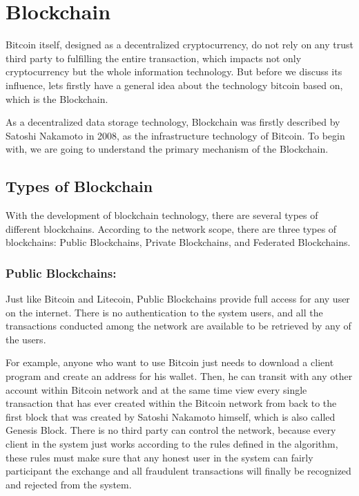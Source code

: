 \documentclass[runningheads]{llncs}
\begin{document}
\section{Blockchain}

Bitcoin itself, designed as a decentralized cryptocurrency, do not rely on any trust third party to fulfilling the entire transaction, which impacts not only cryptocurrency but the whole information technology. But before we discuss its influence, lets firstly have a general idea about the technology bitcoin based on, which is the Blockchain.

As a decentralized data storage technology, Blockchain was firstly described by Satoshi Nakamoto in 2008, as the infrastructure technology of Bitcoin. To begin with, we are going to understand the primary mechanism of the Blockchain.

\subsection{Types of Blockchain}
With the development of blockchain technology, there are several types of different blockchains. According to the network scope, there are three types of blockchains: Public Blockchains, Private Blockchains, and Federated Blockchains.

\subsubsection{Public Blockchains:}
Just like Bitcoin and Litecoin, Public Blockchains provide full access for any user on the internet. There is no authentication to the system users, and all the transactions conducted among the network are available to be retrieved by any of the users.

For example, anyone who want to use Bitcoin just needs to download a client program and create an address for his wallet. Then, he can transit with any other account within Bitcoin network and at the same time view every single transaction that has ever created within the Bitcoin network from back to the first block that was created by Satoshi Nakamoto himself, which is also called Genesis Block. There is no third party can control the network, because every client in the system just works according to the rules defined in the algorithm, these rules must make sure that any honest user in the system can fairly participant the exchange and all fraudulent transactions will finally be recognized and rejected from the system.
\end{document}
